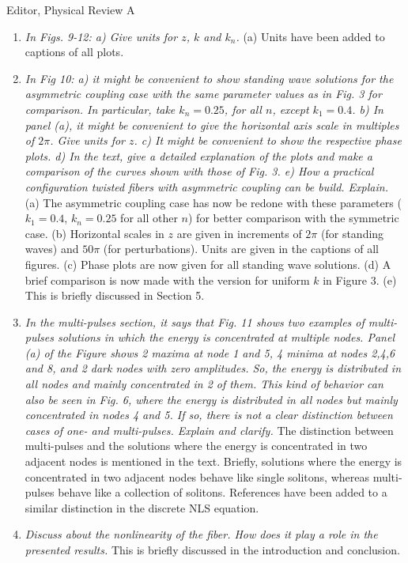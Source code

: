 \documentclass[11pt]{letter}
\begin{document}
\begin{letter}{Editor, Physical Review A}
\begin{enumerate}
\item \emph{In Figs. 9-12: a) Give units for $z$, $k$ and $k_n$.} (a) Units have been added to captions of all plots.

\item \emph{In Fig 10: a) it might be convenient to show standing wave solutions for the asymmetric coupling case with the same parameter values as in Fig. 3 for comparison. In particular, take $k_n=0.25$, for all $n$, except $k_1=0.4$. b) In panel (a), it might be convenient to give the horizontal axis scale in multiples of $2\pi$. Give units for $z$. c) It might be convenient to show the respective phase plots. d) In the text, give a detailed explanation of the plots and make a comparison of the curves shown with those of Fig. 3. e) How a practical configuration twisted fibers with asymmetric coupling can be build. Explain.} (a) The asymmetric coupling case has now be redone with these parameters ($k_1 = 0.4$, $k_n=0.25$ for all other $n$) for better comparison with the symmetric case. (b) Horizontal scales in $z$ are given in increments of $2 \pi$ (for standing waves) and $50 \pi$ (for perturbations). Units are given in the captions of all figures. (c) Phase plots are now given for all standing wave solutions. (d) A brief comparison is now made with the version for uniform $k$ in Figure 3. (e) This is briefly discussed in Section 5.

\item \emph{In the multi-pulses section, it says that Fig. 11 shows two examples of multi-pulses solutions in which the energy is concentrated at multiple nodes. Panel (a) of the Figure shows 2 maxima at node 1 and 5, 4 minima at nodes 2,4,6 and 8, and 2 dark nodes with zero amplitudes. So, the energy is distributed in all nodes and mainly concentrated in 2 of them. This kind of behavior can also be seen in Fig. 6, where the energy is distributed in all nodes but mainly concentrated in nodes 4 and 5. If so, there is not a clear distinction between cases of one- and multi-pulses. Explain and clarify.} The distinction between multi-pulses and the solutions where the energy is concentrated in two adjacent nodes is mentioned in the text. Briefly, solutions where the energy is concentrated in two adjacent nodes behave like single solitons, whereas multi-pulses behave like a collection of solitons. References have been added to a similar distinction in the discrete NLS equation.

\item \emph{Discuss about the nonlinearity of the fiber. How does it play a role in the presented results.} This is briefly discussed in the introduction and conclusion.


\end{enumerate}
\end{letter}
\end{document}
